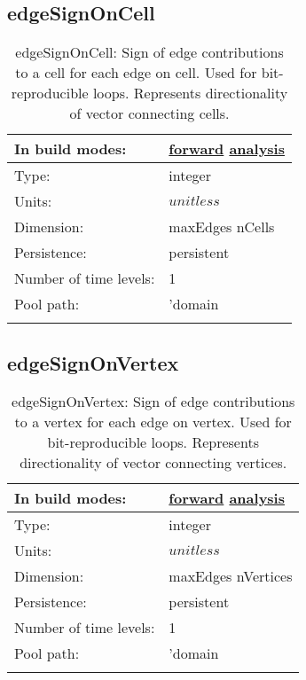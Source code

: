\subsection[edgeSignOnCell]{edgeSignOnCell}
\label{subsec:var_sec_mesh_edgeSignOnCell}
\begin{center}
\begin{longtable}{| p{2.0in} | p{4.0in} |}
        \hline 
        In build modes: & \hyperref[subsec:forward_var_tab_mesh]{forward} \hyperref[subsec:analysis_var_tab_mesh]{analysis} \\
        \hline 
        Type: & integer \\
        \hline 
        Units: & $unitless$ \\
        \hline 
        Dimension: & maxEdges nCells \\
        \hline 
        Persistence: & persistent \\
        \hline 
        Number of time levels: & 1 \\
        \hline 
            Pool path: & 'domain %
 \\
		 \hline 
    \caption{edgeSignOnCell: Sign of edge contributions to a cell for each edge on cell. Used for bit-reproducible loops. Represents directionality of vector connecting cells.}
\end{longtable}
\end{center}
\subsection[edgeSignOnVertex]{edgeSignOnVertex}
\label{subsec:var_sec_mesh_edgeSignOnVertex}
\begin{center}
\begin{longtable}{| p{2.0in} | p{4.0in} |}
        \hline 
        In build modes: & \hyperref[subsec:forward_var_tab_mesh]{forward} \hyperref[subsec:analysis_var_tab_mesh]{analysis} \\
        \hline 
        Type: & integer \\
        \hline 
        Units: & $unitless$ \\
        \hline 
        Dimension: & maxEdges nVertices \\
        \hline 
        Persistence: & persistent \\
        \hline 
        Number of time levels: & 1 \\
        \hline 
            Pool path: & 'domain %
 \\
		 \hline 
    \caption{edgeSignOnVertex: Sign of edge contributions to a vertex for each edge on vertex. Used for bit-reproducible loops. Represents directionality of vector connecting vertices.}
\end{longtable}
\end{center}
